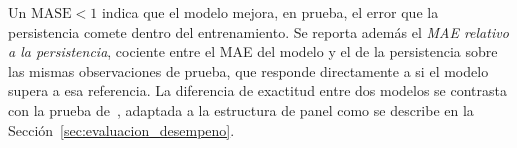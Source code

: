 \begin{enumerate}
\begin{itemize}
    \end{itemize}
    Un $\mathrm{MASE}<1$ indica que el modelo mejora, en prueba, el error que la persistencia comete dentro del entrenamiento. Se reporta además el \emph{MAE relativo a la persistencia}, cociente entre el MAE del modelo y el de la persistencia sobre las mismas observaciones de prueba, que responde directamente a si el modelo supera a esa referencia. La diferencia de exactitud entre dos modelos se contrasta con la prueba de~\cite{diebold1995}, adaptada a la estructura de panel como se describe en la Sección~\ref{sec:evaluacion_desempeno}.
\end{enumerate}














